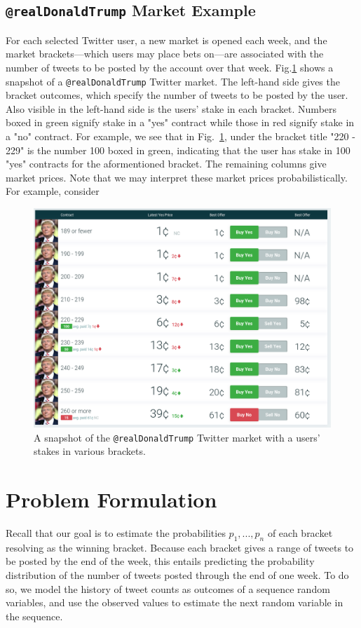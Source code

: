 \documentclass{article}
\begin{document}
\subsection{\lstinline{@realDonaldTrump} Market Example}
For each selected Twitter user,
a new market is opened each week, and the market brackets---which users may place bets
on---are associated with the number of tweets to be posted by the account over that week.
Fig.\ref{market_graphic} shows a snapshot of a \lstinline{@realDonaldTrump} Twitter market.
The left-hand side gives the bracket outcomes, which specify the number of tweets to be posted by the user. Also visible
in the left-hand side is the users' stake in each bracket. Numbers boxed in green signify stake in a "yes" contract while
those in red signify stake in a "no" contract. For example, we see that in Fig.~\ref{market_graphic}, under the bracket title "220 - 229" is
the number 100 boxed in green, indicating that the user has stake in 100 "yes" contracts for the aformentioned bracket.
The remaining columns give market prices.
Note that we may interpret these market prices probabilistically. For example, consider 

\begin{figure}[h!]
    \centering
    \includegraphics[width=1.0\textwidth]{market}
    \caption{A snapshot of the \lstinline{@realDonaldTrump} Twitter market with a users' stakes in various brackets.}
    \label{market_graphic}
\end{figure}

\section{Problem Formulation}
Recall that our goal is to estimate the probabilities $p_1,...,p_n$ of each bracket resolving as the winning bracket. Because each bracket
gives a range of tweets to be posted by the end of the week, this entails 
predicting the probability distribution of the number of tweets posted through the end of one week. To do so,
we model the history of tweet counts as outcomes of a sequence random variables, and use the observed
values to estimate the next random variable in the sequence.
\end{document}
